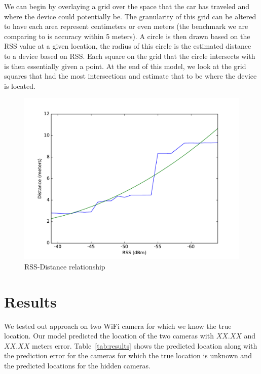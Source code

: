 \documentclass{article}
\begin{document}
We can begin by overlaying a grid over the space that the car has traveled and where
the device could potentially be. The granularity of this grid can be altered to have
each area represent centimeters or even meters (the benchmark we are comparing to
is accuracy within 5 meters). A circle is then drawn based on the RSS value at a given
location, the radius of this circle is the estimated distance to a device based on RSS.
Each square on the grid that the circle intersects with is then essentially given
a point. At the end of this model, we look at the grid squares that had the most
intersections and estimate that to be where the device is located.

\begin{figure}
    \centering
    \vspace{-18pt}
    \includegraphics[width=\linewidth]{figures/rss_distance_plot.pdf}
    \caption{RSS-Distance relationship \label{fig:rss_distance_plot}}
\end{figure}


\section{Results}
\vspace{-.3cm}
We tested out approach on two WiFi camera for which we know the true location. Our
model predicted the location of the two cameras with $XX.XX$ and $XX.XX$ meters error.
Table~\ref{tab:results} shows the predicted location along with the prediction error for the
cameras for which the true location is unknown and the predicted locations for the hidden cameras.
\end{document}
